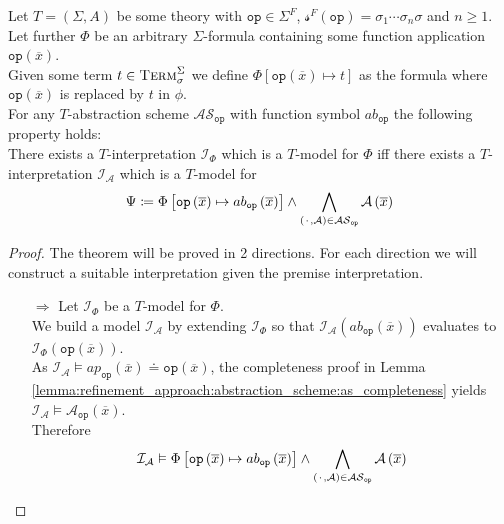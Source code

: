 \begin{theorem}
\label{theorem:abstractions:scheme:equivalence}
Let $T=\left(\Sigma,A\right)$ be some theory with $\texttt{op}\in\Sigma^F$, $\mathcal{s}^F\left(\texttt{op}\right)=\sigma_1\dotsi\sigma_n\sigma$ and $n\geq1$.\\
Let further $\Phi$ be an arbitrary $\Sigma$-formula containing some function application $\texttt{op}\left(\overline{x}\right)$.\\
Given some term $t\in\textsc{Term}_\sigma^\Sigma$ we define $\Phi\left[\texttt{op}\left(\overline{x}\right)\mapsto t \right]$ as the formula where $\texttt{op}\left(\overline{x}\right)$ is replaced by $t$ in $\phi$.\\
For any $T$-abstraction scheme $\mathcal{AS}_{\texttt{op}}$ with function symbol $ab_{\texttt{op}}$ the following property holds:\\
There exists a $T$-interpretation $\mathcal{I}_{\Phi}$ which is a $T$-model for $\Phi$ iff there exists a $T$-interpretation $\mathcal{I}_{\mathcal{A}}$ which is a $T$-model for 
\[
\Psi \coloneqq \Phi\left[ \texttt{op}\left(\overline{x}\right) \mapsto ab_{\texttt{op}}\left(\overline{x}\right) \right] \land \bigwedge\limits_{\left({\mkern 2mu\cdot\mkern 2mu},\mathcal{A}\right)\in\mathcal{AS}_{\texttt{op}}} \mathcal{A}\left(\overline{x}\right)
\]
\begin{proof}
The theorem will be proved in 2 directions. For each direction we will construct a suitable interpretation given the premise interpretation.
\begin{itemize}
    \item[$\Rightarrow$] Let $\mathcal{I}_{\Phi}$ be a $T$-model for $\Phi$.\\
        We build a model $\mathcal{I}_{\mathcal{A}}$ by extending $\mathcal{I}_{\Phi}$ so that $\mathcal{I}_\mathcal{A}\left(ab_{\texttt{op}}\left(\overline{x}\right)\right)$
        evaluates to $\mathcal{I}_{\Phi}\left(\texttt{op}\left(\overline{x}\right)\right)$.\\
        As $\mathcal{I}_{\mathcal{A}} \vDash ap_{\texttt{op}}\left(\overline{x}\right) \doteq \texttt{op}\left(\overline{x}\right)$,
        the completeness proof in Lemma \ref{lemma:refinement_approach:abstraction_scheme:as_completeness} yields\\
        $\mathcal{I}_{\mathcal{A}} \vDash \mathcal{A}_{\texttt{op}}\left(\overline{x}\right)$.\\
        Therefore 
        \[
            \mathcal{I}_{\mathcal{A}} \vDash\Phi\left[ \texttt{op}\left(\overline{x}\right) \mapsto ab_{\texttt{op}}\left(\overline{x}\right) \right] \land \bigwedge\limits_{\left({\mkern 2mu\cdot\mkern 2mu},\mathcal{A}\right)\in\mathcal{AS}_{\texttt{op}}} \mathcal{A}\left(\overline{x}\right)
\]
\end{itemize}
\end{proof}
\end{theorem}
